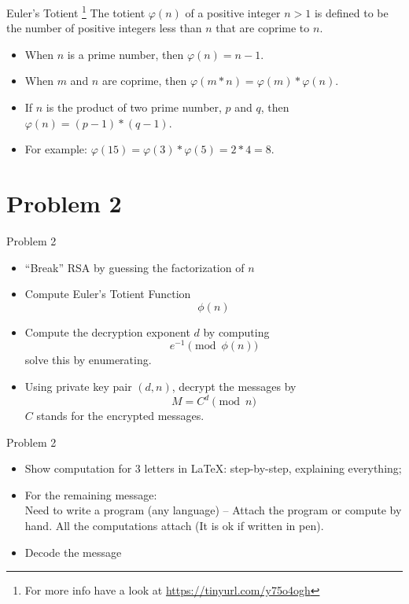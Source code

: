 \documentclass{beamer}
\begin{document}
\begin{frame}{Euler's Totient \footnote{For more info have a look at \url{https://tinyurl.com/y75o4ogh}}}
The totient $\varphi(n)$ of a positive integer $n > 1$ is defined to be the number of positive integers less than $n$ that are coprime to $n$. 
    \begin{itemize}
        \item When $n$ is a prime number, then $\varphi(n) = n - 1$.
        \item When $m$ and $n$ are coprime, then $\varphi(m*n) = \varphi(m) * \varphi(n)$.
        \item If $n$ is the product of two prime number, $p$ and $q$, then $\varphi(n) = (p - 1)*(q - 1)$.
        \item For example: $\varphi(15) = \varphi(3) * \varphi(5) = 2 * 4 = 8$.
      \end{itemize}
\end{frame}

\section{Problem 2}

\begin{frame}{Problem 2}
    \begin{itemize}
        \item ``Break'' RSA by guessing the factorization of $n$
        \item Compute Euler’s Totient Function $$\phi(n)$$ 
        \item Compute the decryption exponent $d$ by computing $$e^{-1} \pmod{\phi(n)}$$ solve this by enumerating.
        \item Using private key pair $(d,n)$, decrypt the messages by $$ M = C^{d} \pmod n$$ $C$ stands for the encrypted messages.
      \end{itemize}
\end{frame}

\begin{frame}{Problem 2}
    \begin{itemize}
        \item Show computation for 3 letters in \LaTeX: step-by-step, explaining everything;
        \item For the remaining message: \\
            Need to write a program (any language) -- Attach the program or compute by hand. All the computations attach (It is ok if written in pen).
        \item Decode the message
    \end{itemize}
\end{frame}
\end{document}

